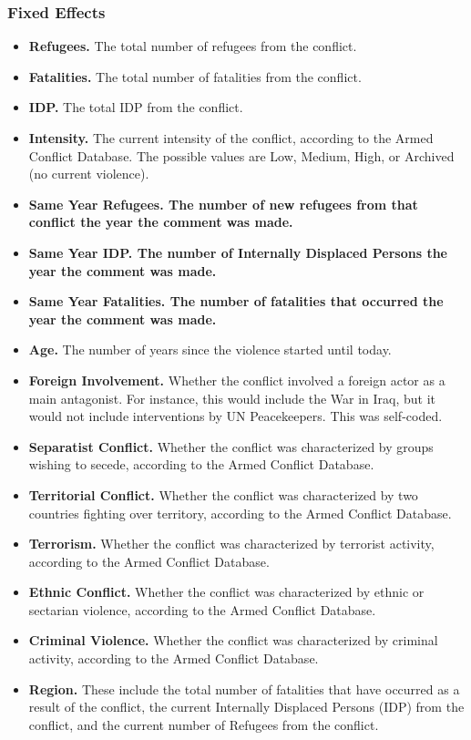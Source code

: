 \subsubsection{Fixed Effects}
\begin{itemize}
\item{\textbf{Refugees.} The total number of refugees from the conflict.}
\item{\textbf{Fatalities.} The total number of fatalities from the conflict.}
\item{\textbf{IDP.} The total IDP from the conflict.}
\item{\textbf{Intensity.} The current intensity of the conflict, according to the Armed Conflict Database. The possible values are Low, Medium, High, or Archived (no current violence).}
\item{\textbf{Same Year Refugees. The number of new refugees from that conflict the year the comment was made.}}
\item{\textbf{Same Year IDP. The number of Internally Displaced Persons the year the comment was made.}}
\item{\textbf{Same Year Fatalities. The number of fatalities that occurred the year the comment was made. }}
\item{\textbf{Age.} The number of years since the violence started until today.}
\item{\textbf{Foreign Involvement.} Whether the conflict involved a foreign actor as a main antagonist. For instance, this would include the War in Iraq, but it would not include interventions by UN Peacekeepers. This was self-coded.}
\item{\textbf{Separatist Conflict.} Whether the conflict was characterized by groups wishing to secede, according to the Armed Conflict Database.}
\item{\textbf{Territorial Conflict.} Whether the conflict was characterized by two countries fighting over territory, according to the Armed Conflict Database.}
\item{\textbf{Terrorism.} Whether the conflict was characterized by terrorist activity, according to the Armed Conflict Database.}
\item{\textbf{Ethnic Conflict.} Whether the conflict was characterized by ethnic or sectarian violence, according to the Armed Conflict Database.}
\item{\textbf{Criminal Violence.} Whether the conflict was characterized by criminal activity, according to the Armed Conflict Database.}
\item{\textbf{Region.} These include the total number of fatalities that have occurred as a result of the conflict, the current Internally Displaced Persons (IDP) from the conflict, and the current number of Refugees from the conflict.}
\end{itemize} 

